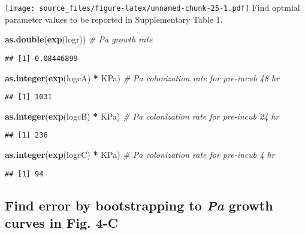 \documentclass[]{article}
\newenvironment{Shaded}{\begin{snugshade}}{\end{snugshade}}
\newcommand{\KeywordTok}[1]{\textcolor[rgb]{0.13,0.29,0.53}{\textbf{#1}}}
\newcommand{\StringTok}[1]{\textcolor[rgb]{0.31,0.60,0.02}{#1}}
\newcommand{\CommentTok}[1]{\textcolor[rgb]{0.56,0.35,0.01}{\textit{#1}}}
\newcommand{\OperatorTok}[1]{\textcolor[rgb]{0.81,0.36,0.00}{\textbf{#1}}}
\newcommand{\NormalTok}[1]{#1}
\begin{document}
\texttt{[image: source\_files/figure-latex/unnamed-chunk-25-1.pdf]} Find
optmial parameter values to be reported in Supplementary Table 1.

\begin{Shaded}
\begin{Highlighting}[]
\KeywordTok{as.double}\NormalTok{(}\KeywordTok{exp}\NormalTok{(logr))  }\CommentTok{# Pa growth rate}
\end{Highlighting}
\end{Shaded}

\begin{verbatim}
## [1] 0.08446899
\end{verbatim}

\begin{Shaded}
\begin{Highlighting}[]
\KeywordTok{as.integer}\NormalTok{(}\KeywordTok{exp}\NormalTok{(logcA) }\OperatorTok{*}\StringTok{ }\NormalTok{KPa)  }\CommentTok{# Pa colonization rate for pre-incub 48 hr}
\end{Highlighting}
\end{Shaded}

\begin{verbatim}
## [1] 1031
\end{verbatim}

\begin{Shaded}
\begin{Highlighting}[]
\KeywordTok{as.integer}\NormalTok{(}\KeywordTok{exp}\NormalTok{(logcB) }\OperatorTok{*}\StringTok{ }\NormalTok{KPa)  }\CommentTok{# Pa colonization rate for pre-incub 24 hr}
\end{Highlighting}
\end{Shaded}

\begin{verbatim}
## [1] 236
\end{verbatim}

\begin{Shaded}
\begin{Highlighting}[]
\KeywordTok{as.integer}\NormalTok{(}\KeywordTok{exp}\NormalTok{(logcC) }\OperatorTok{*}\StringTok{ }\NormalTok{KPa)  }\CommentTok{# Pa colonization rate for pre-incub 4 hr}
\end{Highlighting}
\end{Shaded}

\begin{verbatim}
## [1] 94
\end{verbatim}

\subsection{\texorpdfstring{Find error by bootstrapping to \emph{Pa}
growth curves in Fig.
4-C}{Find error by bootstrapping to Pa growth curves in Fig. 4-C}}\label{find-error-by-bootstrapping-to-pa-growth-curves-in-fig.-4-c}
\end{document}
